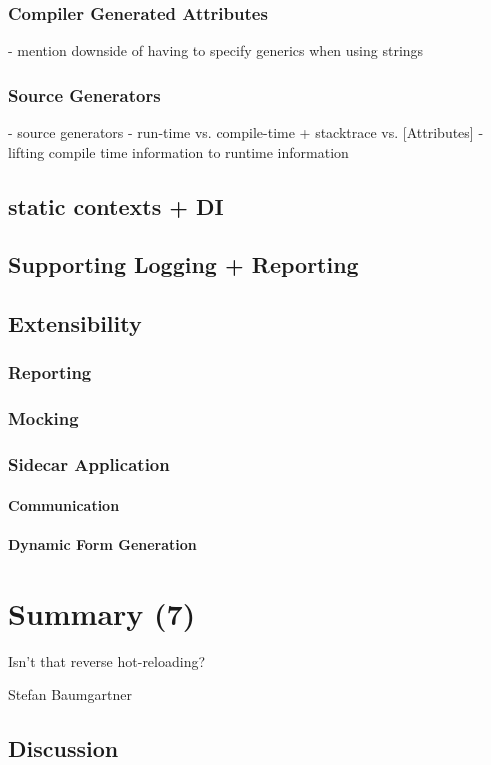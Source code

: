 \documentclass[master,english,smartquotes]{hgbthesis}
\begin{document}
\subsection{Compiler Generated Attributes}
- mention downside of having to specify generics when using strings
\subsection{Source Generators}
- source generators
- run-time vs. compile-time + stacktrace vs. [Attributes]
- lifting compile time information to runtime information
\section{static contexts + DI}
\section{Supporting Logging + Reporting}
\section{Extensibility}
\subsection{Reporting}
\subsection{Mocking}
\subsection{Sidecar Application}
\subsubsection{Communication}
\subsubsection{Dynamic Form Generation}

\chapter{Summary (7)}
\epigraph{Isn't that reverse hot-reloading?}{Stefan Baumgartner}
\section{Discussion}
\end{document}
